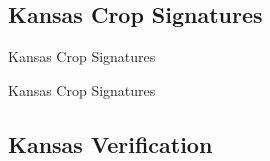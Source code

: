 \documentclass[  compress,xcolor={usenames,dvipsnames}]{beamer}
\begin{document}
\subsection{Kansas Crop Signatures}
\begin{frame}{Kansas Crop Signatures}
\end{frame}

\begin{frame}{Kansas Crop Signatures}
\begin{figure}
  \centering
  \resizebox{0.65\textwidth}{!}{}
\end{figure}
\end{frame}


\subsection{Kansas Verification}
\end{document}
